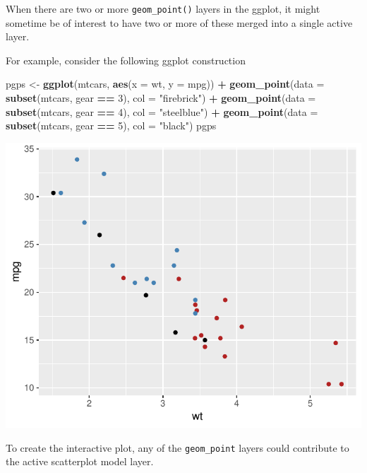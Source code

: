 \documentclass[]{article}
\newenvironment{Shaded}{\begin{snugshade}}{\end{snugshade}}
\newcommand{\KeywordTok}[1]{\textcolor[rgb]{0.13,0.29,0.53}{\textbf{#1}}}
\newcommand{\DataTypeTok}[1]{\textcolor[rgb]{0.13,0.29,0.53}{#1}}
\newcommand{\DecValTok}[1]{\textcolor[rgb]{0.00,0.00,0.81}{#1}}
\newcommand{\StringTok}[1]{\textcolor[rgb]{0.31,0.60,0.02}{#1}}
\newcommand{\OperatorTok}[1]{\textcolor[rgb]{0.81,0.36,0.00}{\textbf{#1}}}
\newcommand{\NormalTok}[1]{#1}
\begin{document}
When there are two or more \texttt{geom\_point()} layers in the ggplot,
it might sometime be of interest to have two or more of these merged
into a single active layer.

For example, consider the following ggplot construction

\begin{Shaded}
\begin{Highlighting}[]
\NormalTok{pgps <-}\StringTok{ }\KeywordTok{ggplot}\NormalTok{(mtcars, }\KeywordTok{aes}\NormalTok{(}\DataTypeTok{x =}\NormalTok{ wt, }\DataTypeTok{y =}\NormalTok{ mpg)) }\OperatorTok{+}
\StringTok{  }\KeywordTok{geom_point}\NormalTok{(}\DataTypeTok{data =} \KeywordTok{subset}\NormalTok{(mtcars, gear }\OperatorTok{==}\StringTok{ }\DecValTok{3}\NormalTok{), }\DataTypeTok{col =} \StringTok{"firebrick"}\NormalTok{) }\OperatorTok{+}
\StringTok{  }\KeywordTok{geom_point}\NormalTok{(}\DataTypeTok{data =} \KeywordTok{subset}\NormalTok{(mtcars, gear }\OperatorTok{==}\StringTok{ }\DecValTok{4}\NormalTok{), }\DataTypeTok{col =} \StringTok{"steelblue"}\NormalTok{) }\OperatorTok{+}
\StringTok{  }\KeywordTok{geom_point}\NormalTok{(}\DataTypeTok{data =} \KeywordTok{subset}\NormalTok{(mtcars, gear }\OperatorTok{==}\StringTok{ }\DecValTok{5}\NormalTok{), }\DataTypeTok{col =} \StringTok{"black"}\NormalTok{)}
\NormalTok{pgps}
\end{Highlighting}
\end{Shaded}

\begin{center}\includegraphics[width=0.7\linewidth]{ggplots2loon_files/figure-latex/multiple geom_points-1} \end{center}

To create the interactive plot, any of the \texttt{geom\_point} layers
could contribute to the active scatterplot model layer.
\end{document}
